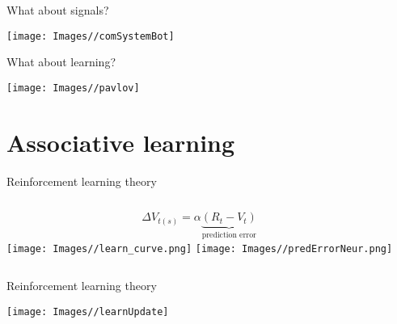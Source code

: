 \documentclass[
  ignorenonframetext,
]{beamer}
\begin{document}
\begin{frame}{What about signals?}
\protect\hypertarget{what-about-signals-2}{}

\begin{center}\texttt{[image: Images//comSystemBot]} \end{center}

\end{frame}

\begin{frame}{What about learning?}
\protect\hypertarget{what-about-learning}{}

\begin{center}\texttt{[image: Images//pavlov]} \end{center}

\end{frame}

\hypertarget{associative-learning}{%
\section{Associative learning}\label{associative-learning}}

\begin{frame}{Reinforcement learning theory}
\protect\hypertarget{reinforcement-learning-theory}{}

\begin{columns}[T]
 \begin{equation*}
  \Delta V_{t(s)}=\alpha \underbrace{(R_t-V_t)}_\text{prediction error}
  \end{equation*}
  \pause
  \texttt{[image: Images//learn\_curve.png]}
  \pause
  \texttt{[image: Images//predErrorNeur.png]}
\end{columns}

\end{frame}

\begin{frame}{Reinforcement learning theory}
\protect\hypertarget{reinforcement-learning-theory-1}{}

\begin{center}\texttt{[image: Images//learnUpdate]} \end{center}

\end{frame}
\end{document}

